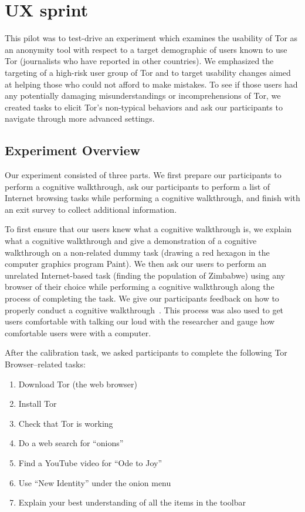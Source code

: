 \documentclass[letterpaper,twocolumn,11pt]{article}
\begin{document}
\appendix

\section{UX sprint}
\label{sec:pilot}
\indent \indent This pilot was to test-drive an experiment which examines the usability of Tor as an anonymity tool
with respect to a target demographic of users known to use Tor (journalists who have reported in other
countries). We emphasized the targeting of a high-risk user group of Tor and to 
target usability changes aimed at helping those who could not afford to make mistakes. To see 
if those users had any potentially damaging misunderstandings or incomprehensions of Tor, 
we created tasks to elicit Tor's non-typical behaviors and ask our participants to
navigate through more advanced settings. 

\subsection{Experiment Overview}
\indent \indent Our experiment consisted of three parts. We first prepare our participants to perform a 
cognitive walkthrough, ask our participants to perform a list of Internet browsing 
tasks while performing a cognitive walkthrough, and finish with an exit survey to collect 
additional information. 

To first ensure that our users knew what a cognitive walkthrough is, we explain what a cognitive
walkthrough and give a demonstration of a cognitive walkthrough on a non-related dummy task 
(drawing a red hexagon in the computer graphics program Paint). We then ask our users to perform
an unrelated Internet-based task (finding the population of Zimbabwe) using any browser of their choice
while performing a cognitive walkthrough along the process of completing the task. We give our 
participants feedback on how to properly conduct a cognitive walkthrough~\cite{wharton1994cognitive}.
This process was also used to get users comfortable with talking our loud with the researcher and gauge 
how comfortable users were with a computer.

After the calibration task, we asked participants to complete
the following Tor Browser--related tasks: 

\begin{enumerate} \itemsep1pt \parskip0pt 
\item Download Tor (the web browser)
\item Install Tor
\item Check that Tor is working
\item Do a web search for ``onions''
\item Find a YouTube video for ``Ode to Joy''
\item Use ``New Identity'' under the onion menu
\item Explain your best understanding of all the items in the toolbar
\end{enumerate}
\end{document}
